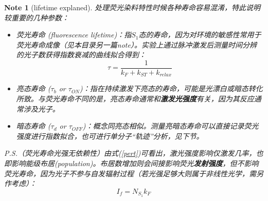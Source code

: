 \documentclass[12pt]{ctexart}
\newtheorem{note}{Note}
\begin{document}
\begin{note}[lifetime explaned]
    处理荧光染料特性时候各种寿命容易混淆，特此说明较重要的几种参数：
    \begin{itemize}
        \item 荧光寿命 (fluorescence lifetime)：指$S_1$态的寿命，因为对环境的敏感性常用于荧光寿命成像（见本目录另一篇note）。实验上通过脉冲激发后测量时间分辨的光子数获得指数衰减的曲线拟合得到：\[\tau=\frac{1}{k_{F}+k_{ST}+k_{relax}}\]
        \item 亮态寿命 ($\tau_b$ or $\tau_{ON}$)：指在持续激发下亮态的寿命，可能是光漂白或暗态转化所致。与荧光寿命不同的是，亮态寿命通常和\textbf{激发光强度}有关，因为其反应通常涉及光子。
        \item 暗态寿命 ($\tau_d$ or $\tau_{OFF}$)：概念同亮态相似。测量亮暗态寿命可以直接记录荧光强度进行指数拟合，也可进行单分子“轨迹”分析，见下节。
    \end{itemize}
    P.S.（荧光寿命光强无依赖性）由式(\ref{pert})可看出，激光强度影响仅激发几率，也即影响能级布居(population)。布居数增加则会间接影响荧光\textbf{发射强度}，但不影响荧光寿命，因为光子不参与自发辐射过程（若光强足够大则属于非线性光学，需另作考虑）：
    \[I_{f}=N_{S_1}k_{F}\]
\end{note}
\end{document}
